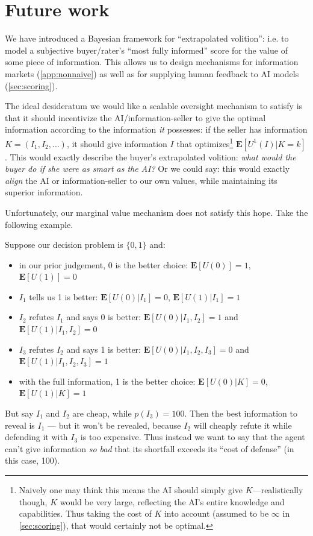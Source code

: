 \section{Future work}
\label{sec:so}

We have introduced a Bayesian framework for ``extrapolated volition'': i.e. to model a subjective buyer/rater's ``most fully informed'' score for the value of some piece of information. This allows us to design mechanisms for information markets (\cref{app:nonnaive}) as well as for supplying human feedback to AI models (\cref{sec:scoring}).

The ideal desideratum we would like a scalable oversight mechanism to satisfy is that it should incentivize the AI/information-seller to give the optimal information according to the information \emph{it} possesses: if the seller has information $K=(I_1,I_2,\dots)$, it should give information $I$ that optimizes\footnote{Naively one may think this means the AI should simply give $K$---realistically though, $K$ would be very large, reflecting the AI's entire knowledge and capabilities. Thus taking the cost of $K$ into account (assumed to be $\infty$ in \cref{sec:scoring}), that would certainly not be optimal.} $\mathbf{E}[U^1(I)|K=k]$. This would exactly describe the buyer's extrapolated volition: \emph{what would the buyer do if she were as smart as the AI?} Or we could say: this would exactly \emph{align} the AI or information-seller to our own values, while maintaining its superior information.

Unfortunately, our marginal value mechanism does not satisfy this hope. Take the following example.

\begin{example}
Suppose our decision problem is $\{0,1\}$ and:
\begin{itemize}
\item in our prior judgement, 0 is the better choice: $\mathbf{E}[U(0)]=1$, $\mathbf{E}[U(1)]=0$
\item  $I_1$ tells us 1 is better: $\mathbf{E}[U(0)|I_1]=0$, $\mathbf{E}[U(1)|I_1]=1$
\item  $I_2$ refutes $I_1$ and says 0 is better: $\mathbf{E}[U(0)|I_1,I_2]=1$ and $\mathbf{E}[U(1)|I_1,I_2]=0$
\item  $I_3$ refutes $I_2$ and says 1 is better: $\mathbf{E}[U(0)|I_1,I_2,I_3]=0$ and $\mathbf{E}[U(1)|I_1,I_2,I_3]=1$
\item with the full information, 1 is the better choice: $\mathbf{E}[U(0)|K]=0$, $\mathbf{E}[U(1)|K]=1$
\end{itemize}

But say $I_1$ and $I_2$ are cheap, while $p(I_3)=100$. Then the best information to reveal is $I_1$ --- but it won't be revealed, because $I_2$ will cheaply refute it while defending it with $I_3$ is too expensive. Thus instead we want to say that the agent can't give information \emph{so bad} that its shortfall exceeds its ``cost of defense'' (in this case, 100).

\end{example}

